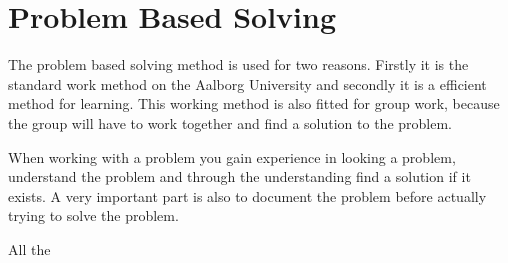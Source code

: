 \section{Problem Based Solving}
The problem based solving method is used for two reasons. Firstly it is the standard work method on the Aalborg University and secondly it is a efficient method for learning.
This working method is also fitted for group work, because the group will have to work together and find a solution to the problem.

When working with a problem you gain experience in looking a problem, understand the problem and through the understanding find a solution if it exists. A very important part is also to document the problem before actually trying to solve the problem.

All the